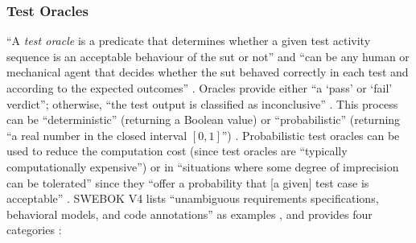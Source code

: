 \subsubsection{Test Oracles}
``A \emph{test oracle} is a predicate that determines whether a given test
activity sequence is an acceptable behaviour of the \acs{sut} or
not'' \citep[p.~509]{BarrEtAl2015} and ``can be any human or mechanical agent
that decides whether the \acs{sut} behaved correctly in each test and according to
the expected outcomes'' \cite[p.~5-5]{SWEBOK2024}. Oracles provide either ``a
`pass' or `fail' verdict''; otherwise, ``the test output is classified as
inconclusive'' \cite[p.~5-5]{SWEBOK2024}. This process can be ``deterministic''
(returning a Boolean value) or ``probabilistic'' (returning ``a real number in
the closed interval $[0, 1]$'') \citep[p.~509]{BarrEtAl2015}. Probabilistic
test oracles can be used to reduce the computation cost (since test oracles
are ``typically computationally expensive'') \citep[p.~509]{BarrEtAl2015}
or in ``situations where some degree of imprecision can be tolerated'' since
they ``offer a probability that [a given] test case is acceptable''
\citep[p.~510]{BarrEtAl2015}. SWEBOK V4 lists ``unambiguous requirements
specifications, behavioral models, and code annotations'' as examples
\cite[p.~5-5]{SWEBOK2024}, and \citeauthor{BarrEtAl2015} provides four
categories \citeyearpar[p.~510]{BarrEtAl2015}:

